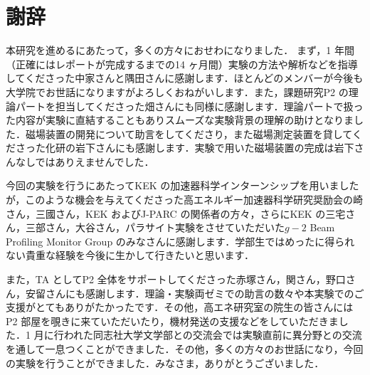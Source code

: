 \section*{謝辞}

本研究を進めるにあたって，多くの方々におせわになりました．
まず，1 年間（正確にはレポートが完成するまでの14 ヶ月間）実験の方法や解析などを指導してくださった中家さんと隅田さんに感謝します．ほとんどのメンバーが今後も大学院でお世話になりますがよろしくおねがいします．また，課題研究P2 の理論パートを担当してくださった畑さんにも同様に感謝します．理論パートで扱った内容が実験に直結することもありスムーズな実験背景の理解の助けとなりました．磁場装置の開発について助言をしてくださり，また磁場測定装置を貸してくださった化研の岩下さんにも感謝します．実験で用いた磁場装置の完成は岩下さんなしではありえませんでした．

今回の実験を行うにあたってKEK の加速器科学インターンシップを用いましたが，このような機会を与えてくださった高エネルギー加速器科学研究奨励会の崎さん，三國さん，KEK およびJ-PARC の関係者の方々，さらにKEK の三宅さん，三部さん，大谷さん，パラサイト実験をさせていただいた$g-2$ Beam Profiling Monitor Group のみなさんに感謝します．学部生ではめったに得られない貴重な経験を今後に生かして行きたいと思います．

また，TA としてP2 全体をサポートしてくださった赤塚さん，関さん，野口さん，安留さんにも感謝します．理論・実験両ゼミでの助言の数々や本実験でのご支援がとてもありがたかったです．その他，高エネ研究室の院生の皆さんにはP2 部屋を覗きに来ていただいたり，機材発送の支援などをしていただきました．1 月に行われた同志社大学文学部との交流会では実験直前に異分野との交流を通して一息つくことができました．その他，多くの方々のお世話になり，今回の実験を行うことができました．みなさま，ありがとうございました．